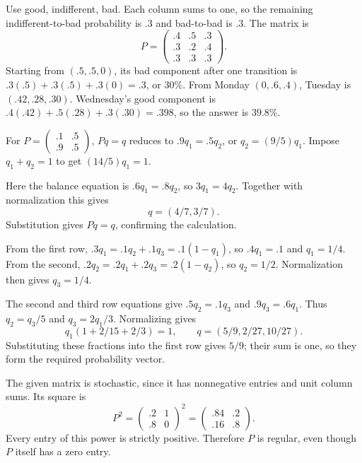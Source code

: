 Use good, indifferent, bad. Each column sums to one, so the remaining
indifferent-to-bad probability is $.3$ and bad-to-bad is $.3$.
The matrix is
\[
 P=\begin{pmatrix}.4&.5&.3\\.3&.2&.4\\.3&.3&.3\end{pmatrix}.
\]
Starting from $(.5,.5,0)$, its bad component after one transition is
$.3(.5)+.3(.5)+.3(0)=.3$, or $30\%$.
From Monday $(0,.6,.4)$, Tuesday is $(.42,.28,.30)$.
Wednesday's good component is $.4(.42)+.5(.28)+.3(.30)=.398$,
so the answer is $39.8\%$.

For $P=\left(\begin{smallmatrix}.1&.5\\.9&.5\end{smallmatrix}\right)$,
$Pq=q$ reduces to $.9q_1=.5q_2$, or $q_2=(9/5)q_1$.
Impose $q_1+q_2=1$ to get $(14/5)q_1=1$.

Here the balance equation is $.6q_1=.8q_2$, so $3q_1=4q_2$.
Together with normalization this gives
\[
 q=(4/7,3/7).
\]
Substitution gives $Pq=q$, confirming the calculation.

From the first row, $.3q_1=.1q_2+.1q_3=.1(1-q_1)$,
so $.4q_1=.1$ and $q_1=1/4$.
From the second, $.2q_2=.2q_1+.2q_3=.2(1-q_2)$,
so $q_2=1/2$. Normalization then gives $q_3=1/4$.

The second and third row equations give $.5q_2=.1q_3$ and
$.9q_3=.6q_1$. Thus $q_2=q_3/5$ and $q_3=2q_1/3$.
Normalizing gives
\[
 q_1(1+2/15+2/3)=1,
 \qquad q=(5/9,2/27,10/27).
\]
Substituting these fractions into the first row gives $5/9$; their sum is
one, so they form the required probability vector.

The given matrix is stochastic, since it has nonnegative entries and unit
column sums. Its square is
\[
 P^2=\begin{pmatrix}.2&1\\.8&0\end{pmatrix}^2
 =\begin{pmatrix}.84&.2\\.16&.8\end{pmatrix}.
\]
Every entry of this power is strictly positive. Therefore $P$ is regular,
even though $P$ itself has a zero entry.

